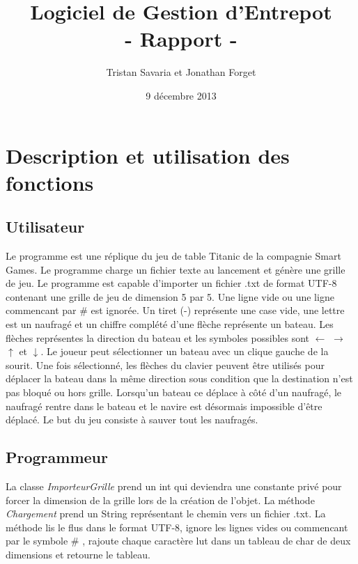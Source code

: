 \documentclass[11pt, french]{article} %
\title{Logiciel de Gestion d'Entrepot\\- Rapport -}
\author{Tristan Savaria et Jonathan Forget}
\date{9 décembre 2013}
\begin{document}
\maketitle
\newpage
\tableofcontents
\newpage
\section{Description et utilisation des fonctions}
\paragraph{}

\subsection{Utilisateur}

Le programme est une réplique du jeu de table Titanic de la compagnie Smart Games. Le programme charge un fichier texte au lancement et génère une grille de jeu. Le programme est capable
d'importer un fichier .txt de format UTF-8 contenant une grille de jeu de dimension 5 par 5. Une ligne vide ou une ligne commencant par \# est ignorée. Un tiret (-) représente une case vide, une lettre est un naufragé et un chiffre complété d'une flèche représente un bateau. Les flèches représentes la direction du bateau et les symboles possibles sont $\leftarrow$ $\rightarrow$ $\uparrow$ et $\downarrow$. Le joueur peut sélectionner un bateau avec un clique gauche de la sourit. Une fois sélectionné, les flèches du clavier peuvent être utilisés pour déplacer la bateau dans la même direction sous condition que la destination n'est pas bloqué ou hors grille. Lorsqu'un bateau ce déplace à côté d'un naufragé, le naufragé rentre dans le bateau et le navire est désormais impossible d'être déplacé. Le but du jeu consiste à sauver tout les naufragés.

\subsection{Programmeur}
La classe \textit{ImporteurGrille} prend un int qui deviendra une constante privé pour forcer la dimension de la grille lors de la création de l'objet. La méthode \textit{Chargement} prend un String représentant le chemin vers un fichier .txt. La méthode lis le flus dans le format UTF-8, ignore les lignes vides ou commencant par le symbole \# , rajoute chaque caractère lut dans un tableau de char de deux dimensions et retourne le tableau.
\newline
\end{document}
